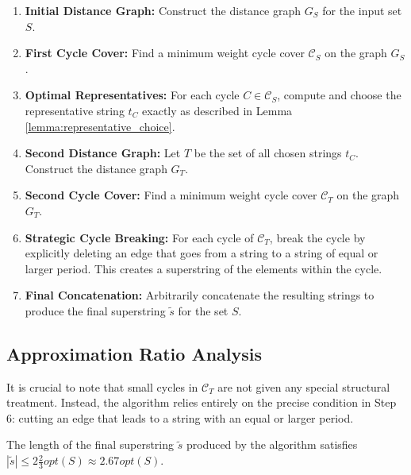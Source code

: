 \begin{enumerate}
    \item \textbf{Initial Distance Graph:} Construct the distance graph $G_S$
    for the input set $S$.
    \item \textbf{First Cycle Cover:} Find a minimum weight cycle cover
    $\mathcal{C}_S$ on the graph $G_S$.
    \item \textbf{Optimal Representatives:} For each cycle $C \in
    \mathcal{C}_S$, compute and choose the representative string $t_C$ exactly
    as described in Lemma \ref{lemma:representative_choice}.
    \item \textbf{Second Distance Graph:} Let $T$ be the set of all chosen
    strings $t_C$. Construct the distance graph $G_T$.
    \item \textbf{Second Cycle Cover:} Find a minimum weight cycle cover
    $\mathcal{C}_T$ on the graph $G_T$.
    \item \textbf{Strategic Cycle Breaking:} For each cycle of $\mathcal{C}_T$,
    break the cycle by explicitly deleting an edge that goes from a string to a
    string of equal or larger period. This creates a superstring of the elements
    within the cycle.
    \item \textbf{Final Concatenation:} Arbitrarily concatenate the resulting
    strings to produce the final superstring $\tilde{s}$ for the set $S$.
\end{enumerate}

\subsection{Approximation Ratio Analysis}
It is crucial to note that small cycles in $\mathcal{C}_T$ are not given any
special structural treatment. Instead, the algorithm relies entirely on the
precise condition in Step 6: cutting an edge that leads to a string with an
equal or larger period.

\begin{theorem} \label{thm:2_67_ratio}
The length of the final superstring $\tilde{s}$ produced by the algorithm
satisfies $|\tilde{s}| \le 2\frac{2}{3} opt(S) \approx 2.67 opt(S)$.
\end{theorem}

